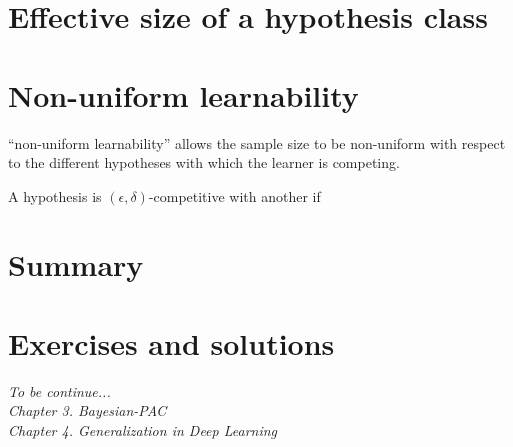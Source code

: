 \documentclass{article}
\begin{document}
\section{Effective size of a hypothesis class}

\section{Non-uniform learnability}

“non-uniform learnability” allows the sample size to be non-uniform with respect to the different hypotheses with which the learner is competing. 

A hypothesis is $(\epsilon, \delta)$-competitive with another if
\section{Summary}
%


\section{Exercises and solutions}

\textit{
      To be continue...\\
      Chapter 3. Bayesian-PAC\\
      Chapter 4. Generalization in Deep Learning}
\end{document}
